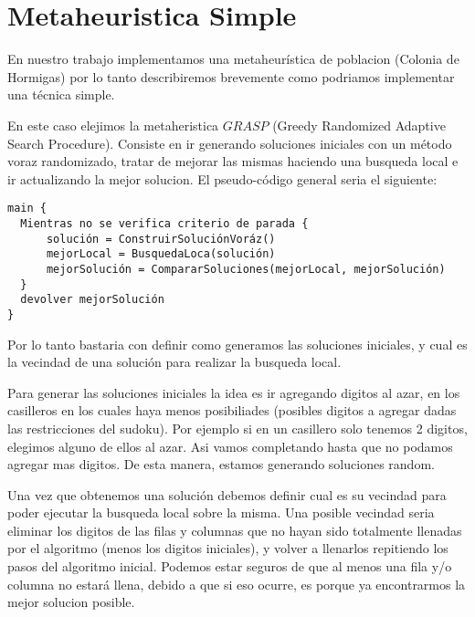 \section{Metaheuristica Simple}
\label{sec:intro}

En nuestro trabajo implementamos una metaheurística de poblacion (Colonia de Hormigas) 
por lo tanto describiremos brevemente como podriamos implementar una técnica 
simple. 

En este caso elejimos la metaheristica $GRASP$ (Greedy Randomized Adaptive Search 
Procedure). Consiste en ir generando soluciones iniciales con un método voraz 
randomizado, tratar de mejorar las mismas haciendo una busqueda local e ir 
actualizando la mejor solucion. El pseudo-código general seria el siguiente:

\begin{Verbatim}[samepage=true]
main {
  Mientras no se verifica criterio de parada {
      solución = ConstruirSoluciónVoráz()
      mejorLocal = BusquedaLoca(solución)
      mejorSolución = CompararSoluciones(mejorLocal, mejorSolución)
  }
  devolver mejorSolución
}
\end{Verbatim}

Por lo tanto bastaria con definir como generamos las soluciones iniciales, y 
cual es la vecindad de una solución para realizar la busqueda local. 

Para generar las soluciones iniciales la idea es ir agregando digitos al azar, 
en los casilleros en los cuales haya menos posibiliades (posibles digitos a agregar dadas las restricciones del sudoku). 
Por ejemplo si en un casillero solo tenemos 2 digitos, elegimos alguno de ellos al azar. Asi vamos completando
hasta que no podamos agregar mas digitos. De esta manera, estamos generando 
soluciones random.


Una vez que obtenemos una solución debemos definir cual es su vecindad para poder ejecutar la busqueda local
sobre la misma. Una posible vecindad seria eliminar los digitos de las filas y columnas que no hayan sido totalmente
llenadas por el algoritmo (menos los digitos iniciales), y volver a llenarlos 
repitiendo los pasos del algoritmo inicial. 
Podemos estar seguros de que al menos una fila y/o columna no 
estará llena, debido a que si eso ocurre, es porque ya encontrarmos la mejor solucion posible.


\newpage
